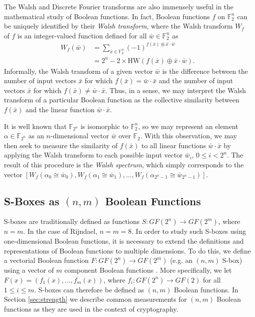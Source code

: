 The Walsh and Discrete Fourier transforms are also immensely useful in the mathematical study of Boolean functions.
In fact, Boolean functions $f$ on $\mathbb{F}_2^n$ can be uniquely identified by their \emph{Walsh transform}, where  
the Walsh transform $W_f$ of $f$ is an integer-valued function defined for all $\bar{w} \in \mathbb{F}_2^n$ as
\begin{align*}
W_f(\bar{w}) & = \sum_{\bar{x} \in \mathbb{F}_2^n}(-1)^{f(\bar{x}) \oplus \bar{x}\cdot\bar{w}} \\
& = 2^n - 2 \times \text{HW}(f(\bar{x}) \oplus \bar{x} \cdot \bar{w}).
\end{align*}
Informally, the Walsh transform of a given vector $\bar{w}$ is the difference between the
number of input vectors $\bar{x}$ for which $f(\bar{x}) = \bar{w} \cdot \bar{x}$ and
the number of input vectors $\bar{x}$ for which $f(\bar{x}) \not= \bar{w} \cdot \bar{x}$.
Thus, in a sense, we may interpret the Walsh transform of a particular Boolean
function as the collective similarity between $f(\bar{x})$ and the linear
function $\bar{w} \cdot \bar{x}$. 

It is well known that $\mathbb{F}_{2^n}$ is isomorphic to $\mathbb{F}_2^n$, so we may represent an element $\alpha \in \mathbb{F}_{2^n}$ as an $n$-dimensional vector $\bar{w}$ over $\mathbb{F}_2$. With this observation, we may then seek to measure the similarity of $f(\bar{x})$ to all linear functions $\bar{w} \cdot \bar{x}$ by applying the Walsh transform to each possible input vector $\bar{w}_i$, $0 \leq i < 2^n$. The result of this procedure is the \emph{Walsh spectrum}, which simply corresponds to the vector $[W_f(\alpha_0 \cong \bar{w}_0), W_f(\alpha_1 \cong \bar{w}_1),\dots,W_f(\alpha_{2^n - 1} \cong \bar{w}_{2^n - 1})]$.

\subsection{S-Boxes as $(n,m)$ Boolean Functions}
S-boxes are traditionally defined as functions $S : GF(2^n) \to GF(2^m)$, where $n = m$. In the case of Rijndael, $n = m = 8$. In order to study such S-boxes using one-dimensional Boolean functions, it is necessary to extend the definitions and representations of Boolean functions to multiple dimensions. To do this, we define a vectorial Boolean function $F : GF(2^n) \to GF(2^m)$ (e.g. an $(n,m)$ S-box) using a vector of $m$ component Boolean functions \cite{Carlet10-1}. More specifically, we let $F(x) = (f_1(x),\dots,f_m(x))$, where $f_i : GF(2^n) \to GF(2)$ for all $1 \leq i \leq m$. S-boxes can therefore be defined as $(n,m)$ Boolean functions. In Section \ref{sec:strength} we describe common measurements for $(n,m)$ Boolean functions as they are used in the context of cryptography.

